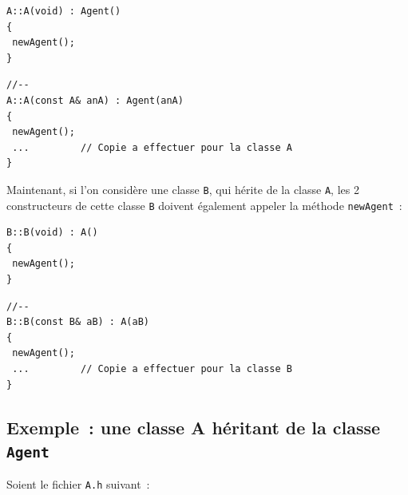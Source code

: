 \documentclass[12pt]{article}
\begin{document}
\begin{footnotesize}
\begin{verbatim}
A::A(void) : Agent()
{
 newAgent();
}
\end{verbatim}
\begin{verbatim}
//--
A::A(const A& anA) : Agent(anA)
{
 newAgent();
 ...         // Copie a effectuer pour la classe A
}
\end{verbatim}
\end{footnotesize}

Maintenant, si l'on consid\`ere une classe {\tt B}, qui h\'erite de la
classe {\tt A}, les 2 constructeurs de cette classe {\tt B}
doivent \'egalement appeler la m\'ethode {\tt newAgent}~:

\begin{footnotesize}
\begin{verbatim}
B::B(void) : A()
{
 newAgent();
}
\end{verbatim}
\begin{verbatim}
//--
B::B(const B& aB) : A(aB)
{
 newAgent();
 ...         // Copie a effectuer pour la classe B
}
\end{verbatim}
\end{footnotesize}

\subsection{Exemple~: une classe A h\'eritant de la classe {\tt Agent}}

Soient le fichier {\tt A.h} suivant~:
\end{document}
